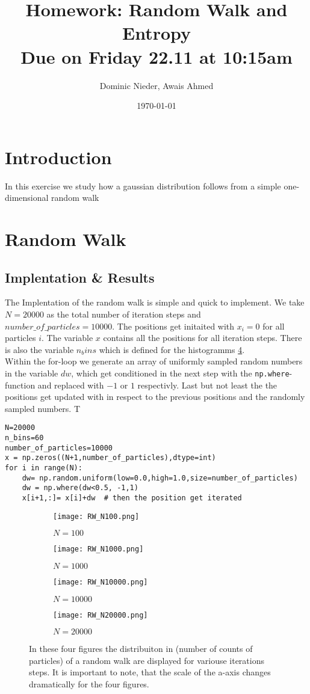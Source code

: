\documentclass{article}[a4paper]
\title{
    \vspace{2in}
    \textmd{\textbf{Homework: Random Walk and Entropy}}\\
    \normalsize\vspace{0.1in}\small{Due on Friday 22.11 at 10:15am}\\
    \vspace{0.1in}
    \vspace{3in}
}
\author{Dominic Nieder, Awais Ahmed}
\date{\today}
\begin{document}
\section{Introduction}

In this exercise we study how a gaussian distribution follows from a simple one-dimensional random walk

\section{Random Walk}
\subsection{Implentation \& Results}

The Implentation of the random walk is simple and quick to implement. 
We take $N=20000$ as the total number of iteration steps and $number\_of\_particles=10000$. The positions get initaited with $x_i=0$ for all particles $i$. The variable $x$ contains all the positions for all iteration steps. There is also the variable $n_bins$ which is defined for the histogramms \ref{fig:probability_disti}. \\
Within the for-loop we generate an array of uniformly sampled random numbers in the variable $dw$, which get conditioned in the next step with the \texttt{np.where}-function and replaced with $-1$ or $1$ respectivly. Last but not least the the positions get updated with in respect to the previous positions and the randomly sampled numbers. T

\begin{lstlisting}
N=20000 
n_bins=60
number_of_particles=10000  
x = np.zeros((N+1,number_of_particles),dtype=int) 
for i in range(N):
    dw= np.random.uniform(low=0.0,high=1.0,size=number_of_particles)  
    dw = np.where(dw<0.5, -1,1)  
    x[i+1,:]= x[i]+dw  # then the position get iterated
\end{lstlisting}


\begin{figure}
\centering
\begin{subfigure}{0.4\textwidth}
    \texttt{[image: RW\_N100.png]}
    \caption{$N=100$}
    \label{fig:first}
\end{subfigure}
\hfill
\begin{subfigure}{0.4\textwidth}
    \texttt{[image: RW\_N1000.png]}
    \caption{$N=1000$}
    \label{fig:second}
\end{subfigure}
\hfill
\begin{subfigure}{0.4\textwidth}
    \texttt{[image: RW\_N10000.png]}
    \caption{$N=10000$}
    \label{fig:third}
\end{subfigure}
\hfill
\begin{subfigure}{0.4\textwidth}
    \texttt{[image: RW\_N20000.png]}
    \caption{$N=20000$}
\end{subfigure}
\caption{In these four figures the distribuiton in (number of counts of particles) of a random walk are displayed for variouse iterations steps. It is important to note, that the scale of the a-axis changes dramatically for the four figures.}
\label{fig:probability_disti}
\end{figure}
\end{document}
